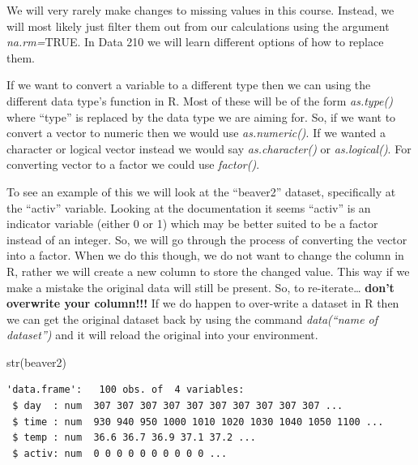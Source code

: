 \documentclass[
  letterpaper,
  DIV=11,
  numbers=noendperiod]{scrreprt}
\newenvironment{Shaded}{\begin{snugshade}}{\end{snugshade}}
\newcommand{\FunctionTok}[1]{\textcolor[rgb]{0.28,0.35,0.67}{#1}}
\newcommand{\NormalTok}[1]{\textcolor[rgb]{0.00,0.23,0.31}{#1}}
\newcommand{\SpecialCharTok}[1]{\textcolor[rgb]{0.37,0.37,0.37}{#1}}
\begin{document}
We will very rarely make changes to missing values in this course.
Instead, we will most likely just filter them out from our calculations
using the argument \emph{na.rm=}TRUE. In Data 210 we will learn
different options of how to replace them.

If we want to convert a variable to a different type then we can using
the different data type's function in R. Most of these will be of the
form \emph{as.type()} where ``type'' is replaced by the data type we are
aiming for. So, if we want to convert a vector to numeric then we would
use \emph{as.numeric()}. If we wanted a character or logical vector
instead we would say \emph{as.character()} or \emph{as.logical()}. For
converting vector to a factor we could use \emph{factor()}.

To see an example of this we will look at the ``beaver2'' dataset,
specifically at the ``activ'' variable. Looking at the documentation it
seems ``activ'' is an indicator variable (either 0 or 1) which may be
better suited to be a factor instead of an integer. So, we will go
through the process of converting the vector into a factor. When we do
this though, we do not want to change the column in R, rather we will
create a new column to store the changed value. This way if we make a
mistake the original data will still be present. So, to
re-iterate\ldots{} \textbf{don't overwrite your column!!!} If we do
happen to over-write a dataset in R then we can get the original dataset
back by using the command \emph{data(``name of dataset'')} and it will
reload the original into your environment.

\begin{Shaded}
\begin{Highlighting}[]
\FunctionTok{str}\NormalTok{(beaver2)}
\end{Highlighting}
\end{Shaded}

\begin{verbatim}
'data.frame':   100 obs. of  4 variables:
 $ day  : num  307 307 307 307 307 307 307 307 307 307 ...
 $ time : num  930 940 950 1000 1010 1020 1030 1040 1050 1100 ...
 $ temp : num  36.6 36.7 36.9 37.1 37.2 ...
 $ activ: num  0 0 0 0 0 0 0 0 0 0 ...
\end{verbatim}

\begin{Shaded}
\end{Shaded}
\end{document}
